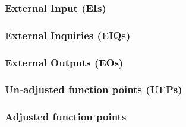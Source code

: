 \subsubsection{External Input (EIs)}

\subsubsection{External Inquiries (EIQs)}

\subsubsection{External Outputs (EOs)}

\subsubsection{Un-adjusted function points (UFPs)}

\subsubsection{Adjusted function points}